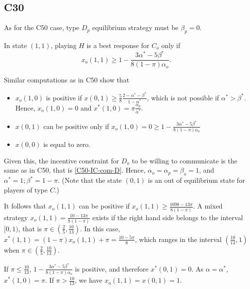 \documentclass[12pt]{article}
\begin{document}
\subsection{C30}
As for the C50 case, type $D_p$ equilibrium strategy must be $\beta_p=0$.

In state $(1,1)$, playing $H$ is a best response for $C_o$ only if 
\begin{equation}\label{c30-x11}
x_o(1,1)\geq 1-\frac{3\alpha^*-5\beta^*}{8(1-\pi)\alpha_o}.
\end{equation}

Similar computations as in C50 show that 
\begin{itemize}
	\item $x_o(1,0)$ is positive if $x(0,1)\geq \frac{5}{8}\frac{2-\alpha^*-\beta^*}{1-\alpha^*}$, which is not possible if $\alpha^*>\beta^*$. Hence, $x_o(1,0)=0$ and $x^*(1,0)=\pi\frac{\alpha_p}{\alpha^*}$.
	\item $x(0,1)$ can be positive only if $x_o(1,0)=0\geq 1-\frac{3\alpha^*-5\beta^*}{8(1-\pi)\alpha_o}$
	\item $x(0,0)$ is equal to zero.
\end{itemize}
Given this, the incentive constraint for $D_o$ to be willing to communicate is the same as in C50, that is \eqref{C50-IC-com-D}. Hence, $\alpha_o=\alpha_p=\beta_o=1$, and $\alpha^*=1;\beta^*=1-\pi$. (Note that the state $(0,1)$ is an out of equilibrium state for players of type $C$.) 

It follows that $x_o(1,1)$ can be positive if $x_o(1,1)\geq \frac{1098-13\pi}{8(1-\pi)}$. A mixed strategy $x_o(1,1)=\frac{10-13\pi}{8(1-\pi)}$ exists if the right hand side belongs to the interval  $[0,1)$, that is $\pi\in \left(\frac{2}{5},\frac{10}{13}\right)$. In this case, $x^*(1,1)=(1-\pi)x_o(1,1)+\pi=\frac{10-5\pi}{8}$, which ranges in the interval $\left(\frac{10}{13} , 1\right)$ when $\pi\in \left(\frac{2}{5},\frac{10}{13}\right)$.  

If $\pi\leq \frac{10}{13}$, $1-\frac{3\alpha^*-5\beta^*}{8(1-\pi)\alpha_o}$ is positive, and therefore $x^*(0,1)=0$. As $\alpha=\alpha^*$, $x^*(1,0)=\pi$. If $\pi>\frac{10}{13}$, we have $x_o(1,1)=x(0,1)=1$. 
\end{document}
